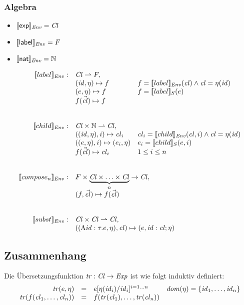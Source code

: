 \documentclass[12pt,a4paper]{article}
\begin{document}
\subsubsection*{Algebra}

\begin{itemize}
\item $[\![\mathsf{exp}]\!]_{\mathit{Env}} = \mathit{Cl}$
\item $[\![\mathsf{label}]\!]_{\mathit{Env}} = F$
\item $[\![\mathsf{nat}]\!]_{\mathit{Env}} = \mathbb N$
\end{itemize}

\[\begin{array}{rll}
  \sem{label}_\Env: & \Cl \pto F, \\
  & (\id,\eta) \mapsto f & f = \sem{label}_\Env(\cl) \wedge \cl = \eta(\id) \\
  & (e,\eta) \mapsto f & f = \sem{label}_S(e) \\
  & f(\vec{\cl}) \mapsto f \\
  \\\\
  \sem{child}_\Env: & \Cl \times \N \pto \Cl, \\
  & ((\id,\eta),i) \mapsto \cl_i & \cl_i = \sem{child}_\Env(\cl, i) \wedge \cl = \eta(\id) \\
  & ((e,\eta),i) \mapsto (e_i,\eta) & e_i = \sem{child}_S(e,i) \\
  & f(\vec{\cl}) \mapsto \cl_i & 1 \le i \le n \\
  \\\\
  \sem{compose_n}_\Env: & \multicolumn{2}{l}{F \times \underbrace{\Cl \times \ldots \times \Cl}_n \to \Cl,} \\
  & \multicolumn{2}{l}{(f,\vec{\cl}) \mapsto f(\vec{\cl})} \\
  \\\\
  \sem{subst}_\Env: & \multicolumn{2}{l}{\Cl \times \Cl \pto \Cl,} \\
  & \multicolumn{2}{l}{((\Lambda\id:\tau.e,\eta),\cl) \mapsto (e,\id:\cl;\eta)}
\end{array}\]


\subsection*{Zusammenhang}

Die \"Ubersetzungsfunktion $\mathit{tr}:\mathit{Cl}\to\mathit{Exp}$ ist wie folgt induktiv definiert:
\[\begin{array}{rcll}
  \mathit{tr}(e,\eta)
  &=& e[\eta(\mathit{id}_i)/\mathit{id}_i]^{i=1 \ldots n}
  & \mathit{dom}(\eta) = \{\mathit{id}_1,\ldots,\mathit{id}_n\}
  \\
  \mathit{tr}(f(\mathit{cl}_1,\ldots,\mathit{cl}_n))
  &=& f(\mathit{tr}(\mathit{cl}_1),\ldots,\mathit{tr}(\mathit{cl}_n))
\end{array}\]
\end{document}
